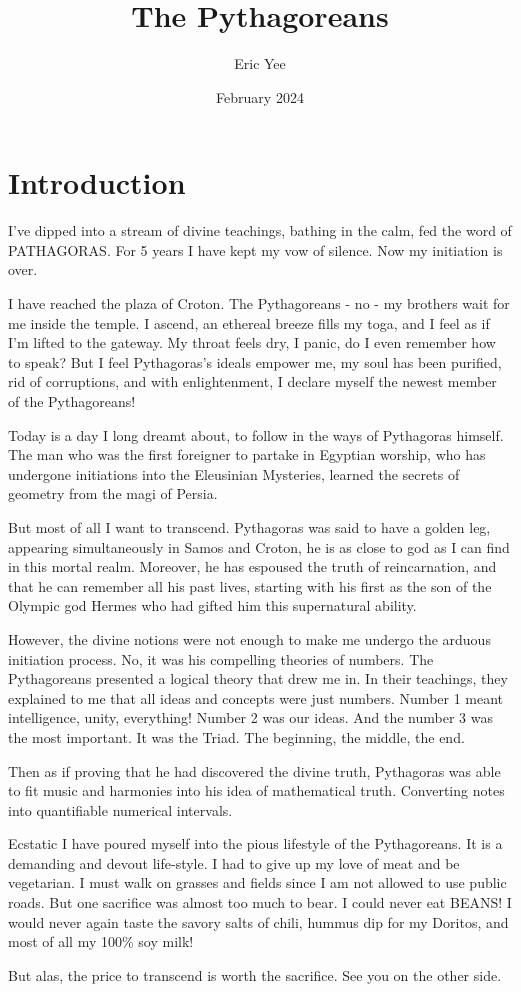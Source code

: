 \documentclass{article}
\title{The Pythagoreans}
\author{Eric Yee}
\date{February 2024}
\begin{document}
\maketitle

\section{Introduction}
I've dipped into a stream of divine teachings, bathing in the calm, fed the word of PATHAGORAS. For 5 years I have kept my vow of silence. Now my initiation is over. 

I have reached the plaza of Croton. The Pythagoreans - no - my brothers wait for me inside the temple. I ascend, an ethereal breeze fills my toga, and I feel as if I'm lifted to the gateway. My throat feels dry, I panic, do I even remember how to speak? But I feel Pythagoras's ideals empower me, my soul has been purified, rid of corruptions, and with enlightenment, I declare myself the newest member of the Pythagoreans!

Today is a day I long dreamt about, to follow in the ways of Pythagoras himself. The man who was the first foreigner to partake in Egyptian worship, who has undergone initiations into the Eleusinian Mysteries, learned the secrets of geometry from the magi of Persia.

But most of all I want to transcend. Pythagoras was said to have a golden leg, appearing simultaneously in Samos and Croton, he is as close to god as I can find in this mortal realm. Moreover, he has espoused the truth of reincarnation, and that he can remember all his past lives, starting with his first as the son of the Olympic god Hermes who had gifted him this supernatural ability. 

However, the divine notions were not enough to make me undergo the arduous initiation process. No, it was his compelling theories of numbers. The Pythagoreans presented a logical theory that drew me in. In their teachings, they explained to me that all ideas and concepts were just numbers. Number 1 meant intelligence, unity, everything! Number 2 was our ideas. And the number 3 was the most important. It was the Triad. The beginning, the middle, the end.

Then as if proving that he had discovered the divine truth, Pythagoras was able to fit music and harmonies into his idea of mathematical truth. Converting notes into quantifiable numerical intervals.

Ecstatic I have poured myself into the pious lifestyle of the Pythagoreans. It is a demanding and devout life-style. I had to give up my love of meat and be vegetarian. I must walk on grasses and fields since I am not allowed to use public roads. But one sacrifice was almost too much to bear. I could never eat BEANS! I would never again taste the savory salts of chili, hummus dip for my Doritos, and most of all my 100\% soy milk!

But alas, the price to transcend is worth the sacrifice. See you on the other side.
\end{document}
